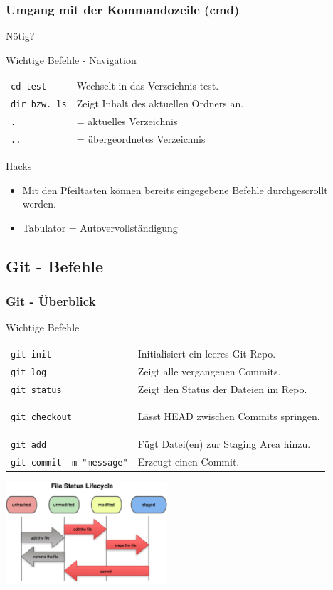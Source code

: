 \documentclass[18pt]{beamer}
\begin{document}
	\begin{frame}
		\frametitle{Umgang mit der Kommandozeile (cmd)}
		Nötig?\linebreak
		\begin{block}{Wichtige Befehle - Navigation}
			\begin{tabular}{ll}
				\texttt{cd test} &  Wechselt in das Verzeichnis test.\\
				\texttt{dir bzw. ls} &  Zeigt Inhalt des aktuellen Ordners an.\\
				\texttt{.} & = aktuelles Verzeichnis\\ 
				\texttt{..} & = übergeordnetes Verzeichnis\\
			\end{tabular}
		\end{block}
		
		\begin{alertblock}{Hacks}
			\begin{itemize}
				\item Mit den Pfeiltasten können bereits eingegebene Befehle durchgescrollt werden.
				\item Tabulator = Autovervollständigung
			\end{itemize}
		\end{alertblock}
		
	\end{frame}
	
	\subsection{Git - Befehle}
	\begin{frame}
		\frametitle{Git - Überblick}
		\begin{block}{Wichtige Befehle}
			\begin{tabular}{ll}
				\texttt{git init} &  Initialisiert ein leeres Git-Repo.\\
				\texttt{git log} &  Zeigt alle vergangenen Commits.\\
				\texttt{git status} &  Zeigt den Status der Dateien im Repo.\\
				\texttt{git checkout} & \begin{small}
					Lässt HEAD zwischen Commits springen. 
				\end{small}\\
				\texttt{git add} &  Fügt Datei(en) zur Staging Area hinzu.\\
				\texttt{git commit -m "message"} &  Erzeugt einen Commit.\\ 
			\end{tabular}
		\end{block}
		\centering \includegraphics[width=60mm, scale=1.5]{./pics/tut0/git-file-lifecycle.png}
	\end{frame}
\end{document}
